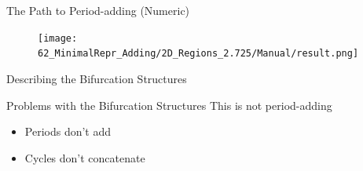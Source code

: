 \begin{frame}{The Path to Period-adding (Numeric)}
	\begin{figure}
		\texttt{[image: 62\_MinimalRepr\_Adding/2D\_Regions\_2.725/Manual/result.png]}
	\end{figure}
\end{frame}

\begin{frame}{Describing the Bifurcation Structures}
	\vspace{-1em}
	\begin{figure}
	\end{figure}
\end{frame}

\begin{frame}{Problems with the Bifurcation Structures}
	This is not period-adding
	\pause
	\begin{itemize}
		\item Periods don't add \pause
		\item Cycles don't concatenate
	\end{itemize}
\end{frame}
